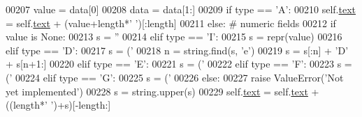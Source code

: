 \begin{DoxyCode}
00207                 value = data[0]
00208                 data = data[1:]
00209                 \textcolor{keywordflow}{if} type == \textcolor{stringliteral}{'A'}:
00210                     self.\hyperlink{classpyneb_1_1utils_1_1_fortran_format_1_1_fortran_line_a70d4893b8dd8ae61297b1d3e4b8bc612}{text} = self.\hyperlink{classpyneb_1_1utils_1_1_fortran_format_1_1_fortran_line_a70d4893b8dd8ae61297b1d3e4b8bc612}{text} + (value+length*\textcolor{stringliteral}{' '})[:length]
00211                 \textcolor{keywordflow}{else}: \textcolor{comment}{# numeric fields}
00212                     \textcolor{keywordflow}{if} value \textcolor{keywordflow}{is} \textcolor{keywordtype}{None}:
00213                         s = \textcolor{stringliteral}{''}
00214                     \textcolor{keywordflow}{elif} type == \textcolor{stringliteral}{'I'}:
00215                         s = repr(value)
00216                     \textcolor{keywordflow}{elif} type == \textcolor{stringliteral}{'D'}:
00217                         s = (\textcolor{stringliteral}{'%
00218                         n = string.find(s, \textcolor{stringliteral}{'e'})
00219                         s = s[:n] + \textcolor{stringliteral}{'D'} + s[n+1:]
00220                     \textcolor{keywordflow}{elif} type == \textcolor{stringliteral}{'E'}:
00221                         s = (\textcolor{stringliteral}{'%
00222                     \textcolor{keywordflow}{elif} type == \textcolor{stringliteral}{'F'}:
00223                         s = (\textcolor{stringliteral}{'%
00224                     \textcolor{keywordflow}{elif} type == \textcolor{stringliteral}{'G'}:
00225                         s = (\textcolor{stringliteral}{'%
00226                     \textcolor{keywordflow}{else}:
00227                         \textcolor{keywordflow}{raise} ValueError(\textcolor{stringliteral}{'Not yet implemented'})
00228                     s = string.upper(s)
00229                     self.\hyperlink{classpyneb_1_1utils_1_1_fortran_format_1_1_fortran_line_a70d4893b8dd8ae61297b1d3e4b8bc612}{text} = self.\hyperlink{classpyneb_1_1utils_1_1_fortran_format_1_1_fortran_line_a70d4893b8dd8ae61297b1d3e4b8bc612}{text} + ((length*\textcolor{stringliteral}{' '})+s)[-length:]
}}}}
\end{DoxyCode}
